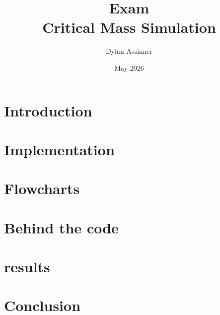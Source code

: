 \documentclass[12pt]{article}
\author{Dylan Assinner}
\title{\Huge{Exam} \\ \Large{Critical Mass Simulation}}
\date{May 2026}
\begin{document}
	\maketitle
	\section*{Introduction}
	
	\section{Implementation}
	
	\section{Flowcharts}
	
	\section{Behind the code}
	
	\section{results}
	
	\section{Conclusion}
	

	\nocite{*}
	\printbibliography
\end{document}
